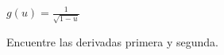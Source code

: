 \item $\displaystyle g(u) = \frac{1}{\sqrt{1 - u}}$
\par
Encuentre las derivadas primera y segunda.
